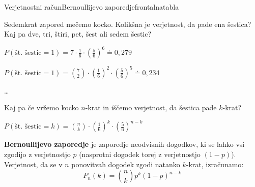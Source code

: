 \begin{priprava}{}{}{Verjetnostni račun}{Bernoullijevo zaporedje}{frontalna}{tabla}

Sedemkrat zapored mečemo kocko. Kolikšna je verjetnost, da pade ena šestica? Kaj pa dve, tri, štiri, pet, šest ali sedem šestic?


$ P(\text{št. šestic} = 1) = 7 \cdot \frac{1}{6} \cdot \left( \frac{5}{6} \right)^6 \doteq 0{,}279 $

$ P(\text{št. šestic} = 1) = \binom 7 2 \cdot \left( \frac{1}{6} \right)^2 \cdot \left( \frac{5}{6} \right)^5 \doteq 0{,}234 $

\ldots

Kaj pa če vržemo kocko $ n $-krat in iščemo verjetnost, da šestica pade $ k $-krat?

$ P(\text{št. šestic} = k) = \binom n k \cdot \left( \frac{1}{6} \right)^k \cdot \left( \frac{5}{6} \right)^{n-k} $

\textbf{Bernoullijevo zaporedje} je zaporedje neodvisnih dogodkov, ki se lahko vsi zgodijo z verjetnostjo $ p $ (nasprotni dogodek torej z verjetnostjo $ (1 - p) $). Verjetnost, da se v $ n $ ponovitvah dogodek zgodi natanko $ k $-krat, izračunamo:
$$ P_n(k) = \binom n k p^k (1 - p)^{n - k} $$

    
\end{priprava}